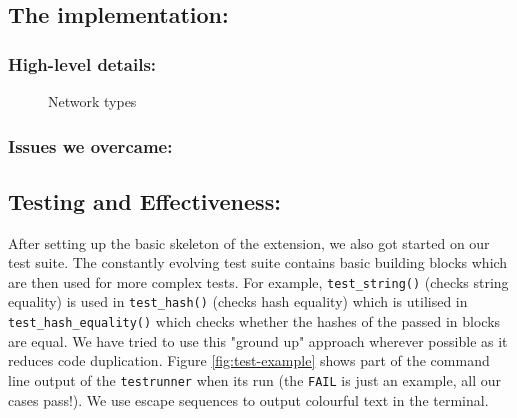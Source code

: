 \documentclass[a4paper]{article}
\begin{document}
\subsection{The implementation:}
\subsubsection{High-level details:}



\begin{figure}[htp]
    \centering
    \qquad
    \caption{Network types}
    \label{fig:network-types}
\end{figure}

\subsubsection{Issues we overcame: }
\lipsum[1-1]

\subsection{Testing and Effectiveness:}
After setting up the basic skeleton of the extension, we also got started on our test suite. The constantly evolving test suite contains basic building blocks which are then used for more complex tests. For example, \verb|test_string()| (checks string equality) is used in \verb|test_hash()| (checks hash equality) which is utilised in \verb|test_hash_equality()| which checks whether the hashes of the passed in blocks are equal. We have tried to use this "ground up" approach wherever possible as it reduces code duplication. Figure \ref{fig:test-example} shows part of the command line output of the \verb|testrunner| when its run (the \texttt{\textcolor{BOLDRED}{FAIL}} is just an example, all our cases pass!). We use escape sequences to output colourful text in the terminal.
\end{document}

